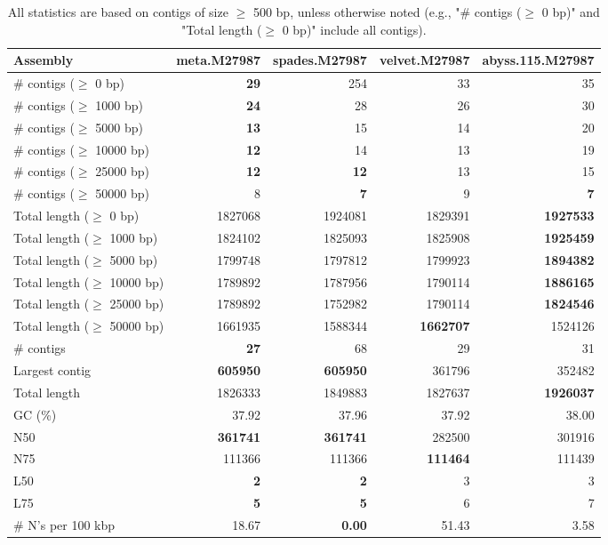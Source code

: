 \documentclass[12pt,a4paper]{article}
\begin{document}
\begin{table}[ht]
\begin{center}
\caption{All statistics are based on contigs of size $\geq$ 500 bp, unless otherwise noted (e.g., "\# contigs ($\geq$ 0 bp)" and "Total length ($\geq$ 0 bp)" include all contigs).}
\begin{tabular}{|l*{4}{|r}|}
\hline
Assembly & meta.M27987 & spades.M27987 & velvet.M27987 & abyss.115.M27987 \\ \hline
\# contigs ($\geq$ 0 bp) & {\bf 29} & 254 & 33 & 35 \\ \hline
\# contigs ($\geq$ 1000 bp) & {\bf 24} & 28 & 26 & 30 \\ \hline
\# contigs ($\geq$ 5000 bp) & {\bf 13} & 15 & 14 & 20 \\ \hline
\# contigs ($\geq$ 10000 bp) & {\bf 12} & 14 & 13 & 19 \\ \hline
\# contigs ($\geq$ 25000 bp) & {\bf 12} & {\bf 12} & 13 & 15 \\ \hline
\# contigs ($\geq$ 50000 bp) & 8 & {\bf 7} & 9 & {\bf 7} \\ \hline
Total length ($\geq$ 0 bp) & 1827068 & 1924081 & 1829391 & {\bf 1927533} \\ \hline
Total length ($\geq$ 1000 bp) & 1824102 & 1825093 & 1825908 & {\bf 1925459} \\ \hline
Total length ($\geq$ 5000 bp) & 1799748 & 1797812 & 1799923 & {\bf 1894382} \\ \hline
Total length ($\geq$ 10000 bp) & 1789892 & 1787956 & 1790114 & {\bf 1886165} \\ \hline
Total length ($\geq$ 25000 bp) & 1789892 & 1752982 & 1790114 & {\bf 1824546} \\ \hline
Total length ($\geq$ 50000 bp) & 1661935 & 1588344 & {\bf 1662707} & 1524126 \\ \hline
\# contigs & {\bf 27} & 68 & 29 & 31 \\ \hline
Largest contig & {\bf 605950} & {\bf 605950} & 361796 & 352482 \\ \hline
Total length & 1826333 & 1849883 & 1827637 & {\bf 1926037} \\ \hline
GC (\%) & 37.92 & 37.96 & 37.92 & 38.00 \\ \hline
N50 & {\bf 361741} & {\bf 361741} & 282500 & 301916 \\ \hline
N75 & 111366 & 111366 & {\bf 111464} & 111439 \\ \hline
L50 & {\bf 2} & {\bf 2} & 3 & 3 \\ \hline
L75 & {\bf 5} & {\bf 5} & 6 & 7 \\ \hline
\# N's per 100 kbp & 18.67 & {\bf 0.00} & 51.43 & 3.58 \\ \hline
\end{tabular}
\end{center}
\end{table}
\end{document}

